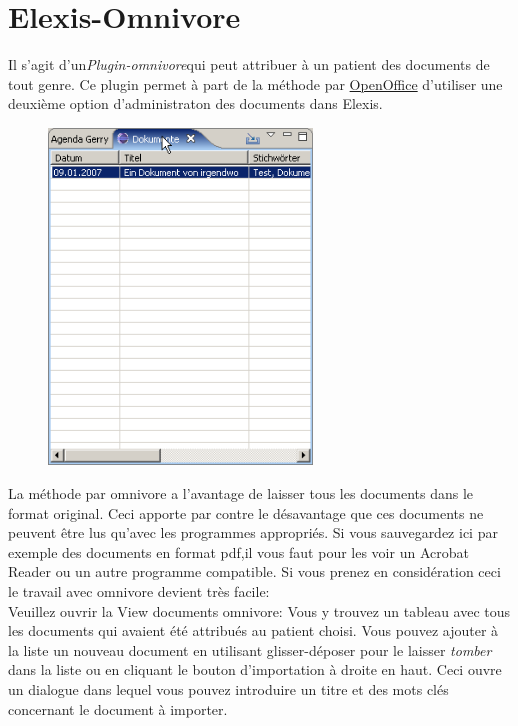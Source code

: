 
\section{Elexis-Omnivore}
Il s'agit d'un\textit{Plugin-omnivore}qui peut attribuer à un patient des documents de tout genre. Ce plugin permet à part de la méthode par \href{http://www.elexis.ch/jp/index.php?option=content&task=view&id=107}{OpenOffice} d'utiliser une deuxième option d'administraton des documents dans Elexis.

\begin{figure}
\includegraphics[width=7cm]{images/omnivore1}
\end{figure}

La méthode par omnivore a l'avantage de laisser tous les documents dans le format original. Ceci apporte par contre le désavantage que ces documents ne peuvent être lus qu'avec les programmes appropriés. Si vous sauvegardez ici par exemple des documents en format pdf,il vous faut pour les voir un Acrobat Reader ou un autre programme compatible. Si vous prenez en considération ceci le travail avec omnivore devient très facile:\\
\medskip
Veuillez ouvrir la View documents omnivore:
Vous y trouvez un tableau avec tous les documents qui avaient été attribués au patient choisi. Vous pouvez ajouter à la liste un nouveau document en utilisant glisser-déposer pour le laisser \textit{tomber} dans la liste ou en cliquant le bouton d'importation à droite en haut. Ceci ouvre un dialogue dans lequel vous pouvez introduire un titre et des mots clés concernant le document à importer.


